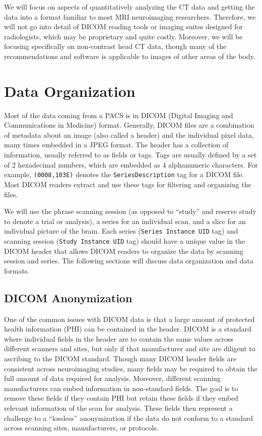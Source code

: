 \documentclass[]{elsarticle} %
\begin{document}
We will focus on aspects of quantitatively analyzing the CT data and
getting the data into a format familiar to most MRI neuroimaging
researchers. Therefore, we will not go into detail of DICOM reading
tools or imaging suites designed for radiologists, which may be
proprietary and quite costly. Moreover, we will be focusing specifically
on non-contrast head CT data, though many of the recommendations and
software is applicable to images of other areas of the body.

\hypertarget{data-organization}{%
\section{Data Organization}\label{data-organization}}

Most of the data coming from a PACS is in DICOM (Digital Imaging and
Communications in Medicine) format. Generally, DICOM files are a
combination of metadata about an image (also called a header) and the
individual pixel data, many times embedded in a JPEG format. The header
has a collection of information, usually referred to as fields or tags.
Tags are usually defined by a set of 2 hexadecimal numbers, which are
embedded as 4 alphanumeric characters. For example, \texttt{(0008,103E)}
denotes the \texttt{SeriesDescription} tag for a DICOM file. Most DICOM
readers extract and use these tags for filtering and organizing the
files.

We will use the phrase scanning session (as opposed to ``study'' and
reserve study to denote a trial or analysis), a series for an individual
scan, and a slice for an individual picture of the brain. Each series
(\texttt{Series\ Instance\ UID} tag) and scanning session
(\texttt{Study\ Instance\ UID} tag) should have a unique value in the
DICOM header that allows DICOM readers to organize the data by scanning
session and series. The following sections will discuss data
organization and data formats.

\hypertarget{dicom-anonymization}{%
\subsection{DICOM Anonymization}\label{dicom-anonymization}}

One of the common issues with DICOM data is that a large amount of
protected health information (PHI) can be contained in the header. DICOM
is a standard where individual fields in the header are to contain the
same values across different scanners and sites, but only if that
manufacturer and site are diligent to ascribing to the DICOM standard.
Though many DICOM header fields are consistent across neuroimaging
studies, many fields may be required to obtain the full amount of data
required for analysis. Moreover, different scanning manufacturers can
embed information in non-standard fields. The goal is to remove these
fields if they contain PHI but retain these fields if they embed
relevant information of the scan for analysis. These fields then
represent a challenge to a ``lossless'' anonymization if the data do not
conform to a standard across scanning sites, manufacturers, or
protocols.
\end{document}
